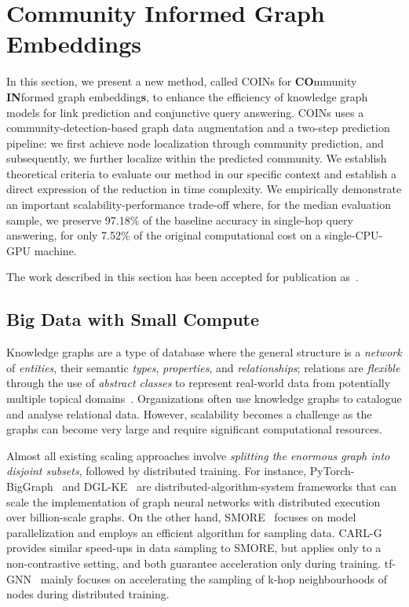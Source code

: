 \section{Community Informed Graph Embeddings}
\label{sec: coins}

In this section, we present a new method, called COINs for \textbf{CO}mmunity \textbf{IN}formed graph embedding\textbf{s}, to enhance the efficiency of knowledge graph models for link prediction and conjunctive query answering. COINs uses a community-detection-based graph data augmentation and a two-step prediction pipeline: we first achieve node localization through community prediction, and subsequently, we further localize within the predicted community. We establish theoretical criteria to evaluate our method in our specific context and establish a direct expression of the reduction in time complexity. We empirically demonstrate an important scalability-performance trade-off where, for the median evaluation sample, we preserve 97.18\% of the baseline accuracy in single-hop query answering, for only 7.52\% of the original computational cost on a single-CPU-GPU machine. 

The work described in this section has been accepted for publication as~\cite{janchevski_coins_2025}.

\subsection{Big Data with Small Compute}
Knowledge graphs are a type of database where the general structure is a \emph{network} of \emph{entities}, their semantic \emph{types}, \emph{properties}, and \emph{relationships}; relations are \emph{flexible} through the use of \emph{abstract classes} to represent real-world data from potentially multiple topical domains~\cite{ehrlinger_towards_2016,hogan_knowledge_2020}. Organizations often use knowledge graphs to catalogue and analyse relational data. However, scalability becomes a challenge as the graphs can become very large and require significant computational resources.

Almost all existing scaling approaches involve \emph{splitting the enormous graph into disjoint subsets}, followed by distributed training.
For instance, PyTorch-BigGraph~\cite{lerer_pytorch-biggraph_2019} and DGL-KE~\cite{zheng_dgl-ke_2020} are distributed-algorithm-system frameworks that can scale the implementation of graph neural networks with distributed execution over billion-scale graphs.
On the other hand, SMORE~\cite{ren_smore_2021} focuses on model parallelization and employs an efficient algorithm for sampling data. CARL-G~\cite{shiao_carl-g_2023} provides similar speed-ups in data sampling to SMORE, but applies only to a non-contrastive setting, and both guarantee acceleration only during training. tf-GNN~\cite{ferludin_tf-gnn_2022} mainly focuses on accelerating the sampling of k-hop neighbourhoods of nodes during distributed training.

